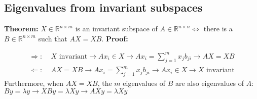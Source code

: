 \documentclass{article}
\begin{document}
\subsection{Eigenvalues from invariant subspaces}
\textbf{Theorem:} $X \in \mathbb{R}^{n \times m}$ is an invariant subspace of $A \in \mathbb{R}^{n \times n} \Leftrightarrow$ there is a $B \in \mathbb{R}^{n \times m}$ such that $AX = XB$. \textbf{Proof:}

\begin{align*}
    \Rightarrow: \;& X \textrm{ invariant} \longrightarrow Ax_i \in X \longrightarrow Ax_i = \sum_{j=1}^mx_jb_{ji} \longrightarrow AX = XB\\
    \Leftarrow: \;& AX = XB \longrightarrow Ax_i = \sum_{j=1}^mx_jb_{ji} \longrightarrow Ax_i \in X \longrightarrow X \textrm{ invariant}
\end{align*}
Furthermore, when $AX = XB$, the $m$ eigenvalues of $B$ are also eigenvalues of $A$: $By = \lambda y \longrightarrow XBy = \lambda Xy \longrightarrow AXy = \lambda Xy$
\end{document}
